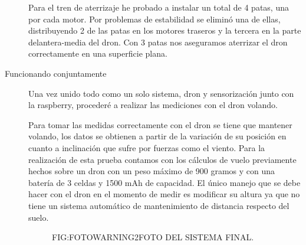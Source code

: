 \begin{description}
Para el tren de aterrizaje he probado a instalar un total de 4 patas, una por cada motor. Por problemas de estabilidad se eliminó una de ellas, distribuyendo 2 de las patas en los motores traseros y la tercera en la parte delantera-media del dron. Con 3 patas nos aseguramos aterrizar el dron correctamente en una superficie plana.

\item[Funcionando conjuntamente]

Una vez unido todo como un solo sistema, dron y sensorización junto con la raspberry, procederé a realizar las mediciones con el dron volando.

Para tomar las medidas correctamente con el dron se tiene que mantener volando, los datos se obtienen a partir de la variación de su posición en cuanto a inclinación que sufre por fuerzas como el viento.
Para la realización de esta prueba contamos con los cálculos de vuelo previamente hechos sobre un dron con un peso máximo de 900 gramos y con una batería de 3 celdas y 1500 mAh de capacidad. El único manejo que se debe hacer con el dron en el momento de medir es modificar su altura ya que no tiene un sistema automático de mantenimiento de distancia respecto del suelo.

  \begin{figure}[Foto del dron con sensorización de viento]{FIG:FOTOWARNING2}{FOTO DEL SISTEMA FINAL.}
\end{figure}


\end{description}

